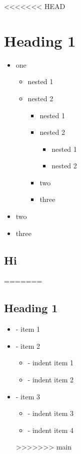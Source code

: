\documentclass{article}
\begin{document}
 
\setcounter{secnumdepth}{0}

<<<<<<< HEAD
    
\section{Heading 1}
\begin{itemize}
    \item one
\begin{itemize}
    \item nested 1
    \item nested 2
\begin{itemize}
    \item nested 1
    \item nested 2
\begin{itemize}
    \item nested 1
    \item nested 2
\end{itemize}

    \item two
    \item three
\end{itemize}

\end{itemize}

\end{itemize}

\begin{itemize}
    \item two
    \item three
\end{itemize}

\subsection{Hi}

=======
\subsection{Heading 1}

\begin{itemize}
    \item - item 1
    \item - item 2
\begin{itemize}
    \item     - indent item 1
    \item     - indent item 2
\end{itemize}

    \item - item 3
\begin{itemize}
    \item     - indent item 3
    \item     - indent item 4
\end{itemize}
>>>>>>> main
\end{itemize}
\end{document}
